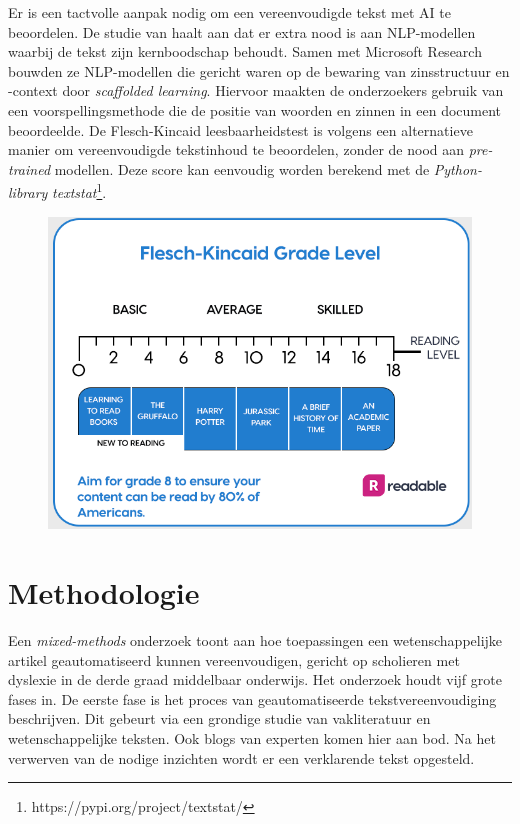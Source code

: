 Er is een tactvolle aanpak nodig om een vereenvoudigde tekst met AI te beoordelen. De studie van \textcite{Swayamdipta2019} haalt aan dat er extra nood is aan NLP-modellen waarbij de tekst zijn kernboodschap behoudt. Samen met Microsoft Research bouwden ze NLP-modellen die gericht waren op de bewaring van zinsstructuur en -context door \emph{scaffolded learning}. Hiervoor maakten de onderzoekers gebruik van een voorspellingsmethode die de positie van woorden en zinnen in een document beoordeelde. De Flesch-Kincaid leesbaarheidstest is volgens \newline \textcite{Readable2021} een alternatieve manier om vereenvoudigde tekstinhoud te beoordelen, zonder de nood aan \textit{pre-trained} modellen. Deze score kan eenvoudig worden berekend met de \textit{Python-library} \textit{textstat}\footnote{https://pypi.org/project/textstat/}. 

\begin{figure}
	\includegraphics[width=\linewidth]{img/Screenshot_302.png}
	\caption{\autocite{Readable2021}}
\end{figure}

\section{Methodologie}%
\label{sec:methodologie}
Een \textit{mixed-methods} onderzoek toont aan hoe toepassingen een wetenschappelijke artikel geautomatiseerd kunnen vereenvoudigen, gericht op scholieren met dyslexie in de derde graad middelbaar onderwijs. Het onderzoek houdt vijf grote fases in. De eerste fase is het proces van geautomatiseerde tekstvereenvoudiging beschrijven. Dit gebeurt via een grondige studie van vakliteratuur en wetenschappelijke teksten. Ook blogs van experten komen hier aan bod. Na het verwerven van de nodige inzichten wordt er een verklarende tekst opgesteld.

